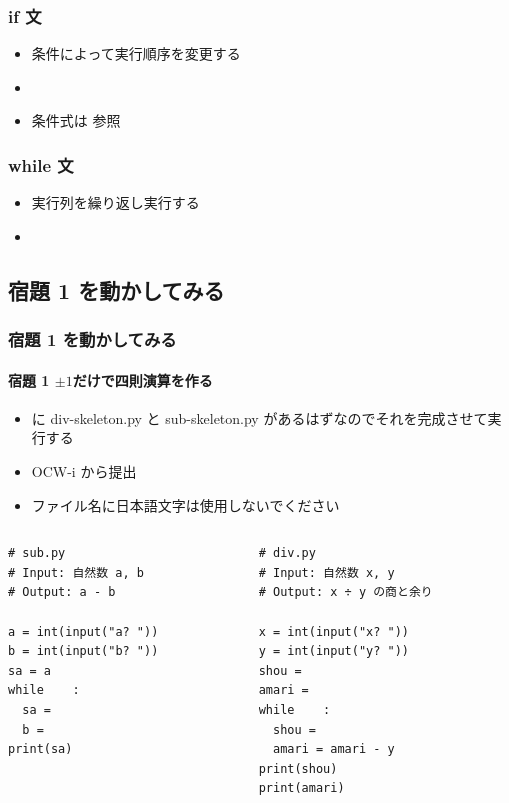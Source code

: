 \begin{frame}[fragile,label=if]
\frametitle{if 文}
  \begin{itemize}
\item 条件によって実行順序を変更する
\item \hyperlink{gcd}{}
\item 条件式は \href{https://docs.python.org/ja/3/reference/index.html}{}参照
  \end{itemize}
\end{frame}
\begin{frame}[fragile,label=while]
\frametitle{while 文}
  \begin{itemize}
\item 実行列を繰り返し実行する
\item \hyperlink{mult}{}
  \end{itemize}
\end{frame}
\subsection{宿題 1 を動かしてみる}
\begin{frame}
\frametitle{宿題 1 を動かしてみる}
\framesubtitle{宿題 1 \textendash $\pm 1$だけで四則演算を作る}
  \begin{itemize}
\item \href{https://sites.google.com/a/presystems.xyz/sample/home/elementary-computer-science}{} に div-skeleton.py と sub-skeleton.py があるはずなのでそれを完成させて実行する
\item OCW-i から提出
\item ファイル名に日本語文字は使用しないでください
  \end{itemize}
  \begin{columns}
    \begin{column}{0.45\textwidth}
      \begin{lstlisting}[caption={sub.py},label=lst:sub]
# sub.py
# Input: 自然数 a, b
# Output: a - b

a = int(input("a? "))
b = int(input("b? "))
sa = a               
while    :
  sa = 
  b = 
print(sa)
      \end{lstlisting}
    \end{column}
    \begin{column}{0.45\textwidth}
      \begin{lstlisting}[caption={div.py},label=lst:div]
# div.py
# Input: 自然数 x, y
# Output: x ÷ y の商と余り

x = int(input("x? "))
y = int(input("y? "))
shou = 
amari = 
while    :
  shou = 
  amari = amari - y
print(shou)
print(amari)
      \end{lstlisting}
    \end{column}
  \end{columns}
\end{frame}
%
%

